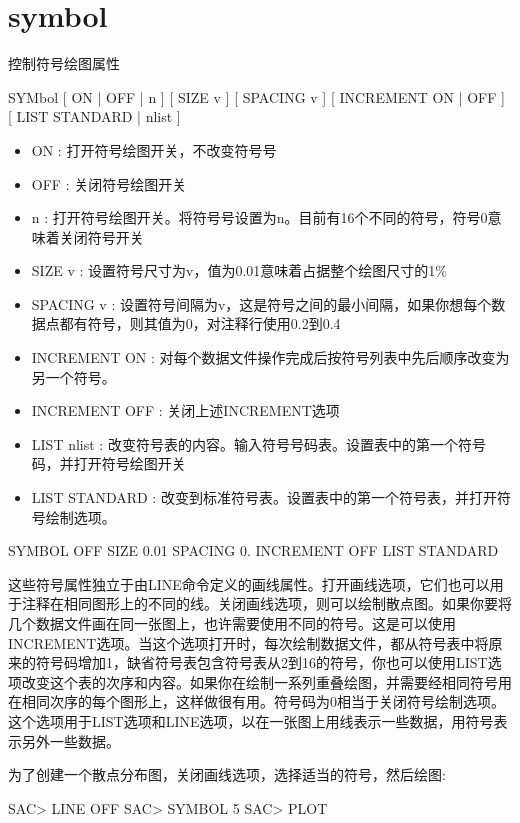 \section{symbol}
\label{cmd:symbol}

控制符号绘图属性

SYMbol [ ON | OFF | n ] [ SIZE v ] [ SPACING v ] [ INCREMENT ON | OFF ] [ LIST STANDARD | nlist ]

\begin{itemize}
\item ON : 打开符号绘图开关，不改变符号号 
\item OFF : 关闭符号绘图开关 
\item n : 打开符号绘图开关。将符号号设置为n。目前有16个不同的符号，符号0意味着关闭符号开关  
\item SIZE v : 设置符号尺寸为v，值为0.01意味着占据整个绘图尺寸的1\%	
\item SPACING v : 设置符号间隔为v，这是符号之间的最小间隔，如果你想每个数据点都有符号，则其值为0，对注释行使用0.2到0.4
\item INCREMENT {ON} : 对每个数据文件操作完成后按符号列表中先后顺序改变为另一个符号。 
\item INCREMENT OFF : 关闭上述INCREMENT选项 
\item LIST nlist : 改变符号表的内容。输入符号号码表。设置表中的第一个符号码，并打开符号绘图开关 
\item LIST STANDARD : 改变到标准符号表。设置表中的第一个符号表，并打开符号绘制选项。 
\end{itemize}

SYMBOL OFF SIZE 0.01 SPACING 0. INCREMENT OFF LIST STANDARD

这些符号属性独立于由LINE命令定义的画线属性。打开画线选项，它们也可以用于注释在相同图形上的不同的线。关闭画线选项，则可以绘制散点图。如果你要将几个数据文件画在同一张图上，也许需要使用不同的符号。这是可以使用INCREMENT选项。当这个选项打开时，每次绘制数据文件，都从符号表中将原来的符号码增加1，缺省符号表包含符号表从2到16的符号，你也可以使用LIST选项改变这个表的次序和内容。如果你在绘制一系列重叠绘图，并需要经相同符号用在相同次序的每个图形上，这样做很有用。符号码为0相当于关闭符号绘制选项。这个选项用于LIST选项和LINE选项，以在一张图上用线表示一些数据，用符号表示另外一些数据。

为了创建一个散点分布图，关闭画线选项，选择适当的符号，然后绘图:
\begin{SACCode}
SAC> LINE OFF
SAC> SYMBOL 5
SAC> PLOT
\end{SACCode}

